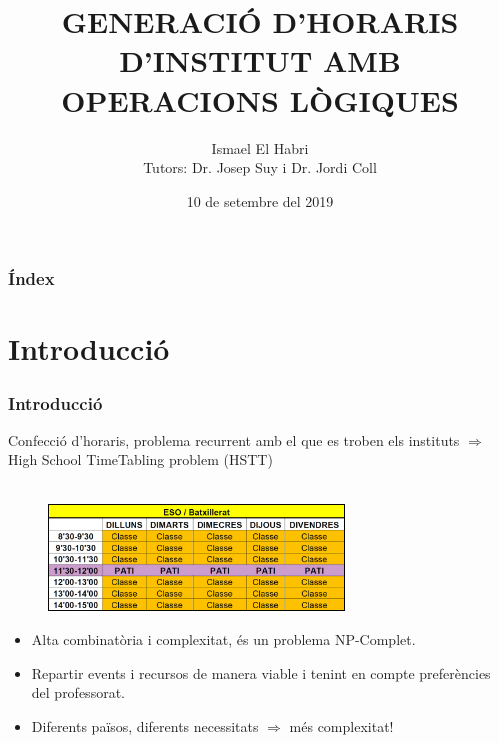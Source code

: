 \documentclass[11pt]{beamer}
\title[Generació d'horaris d'institut amb operacions lògiques]{GENERACIÓ D'HORARIS D'INSTITUT AMB OPERACIONS LÒGIQUES}
\author[Ismael El Habri]{Ismael El Habri \\ \footnotesize Tutors: Dr. Josep Suy i Dr. Jordi Coll}
\institute{Universitat de Girona}
\date[KPT 2004] %
{10 de setembre del 2019}
\begin{document}
\frame{\titlepage}
\begin{frame}
  \frametitle{Índex}
  \tableofcontents
\end{frame}

\section{Introducció}
  \begin{frame}
    \frametitle{Introducció}

    Confecció d'horaris, problema recurrent amb el que es troben els instituts $\Rightarrow$ High School TimeTabling problem (HSTT)\\ ~\\

    \begin{figure}
      \includegraphics[width=0.7\textwidth]{Diagrames/horari.jpg}
    \end{figure}
    
    \begin{itemize}
      \item Alta combinatòria i complexitat, és un problema NP-Complet.
      \item Repartir events i recursos de manera viable i tenint en compte preferències del professorat.
      \item Diferents països, diferents necessitats  $\Rightarrow$  més complexitat!
    \end{itemize}
    
    


  \end{frame}
\end{document}
